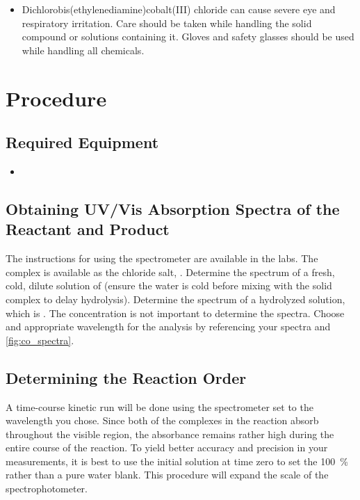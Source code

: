 \begin{itemize}
	\item Dichlorobis(ethylenediamine)cobalt(III) chloride can cause severe eye and respiratory irritation. Care should be taken while handling the solid compound or solutions containing it. Gloves and safety glasses should be used while handling all chemicals. 
\end{itemize}

\section{Procedure}
\label{sec:procedure}

\subsection{Required Equipment}
\label{subs:req_equip}

\begin{itemize}
	\item 
\end{itemize}

\subsection{Obtaining UV/Vis Absorption Spectra of the Reactant and Product}

The instructions for using the spectrometer are available in the labs. The  complex is available as the chloride salt, . Determine the spectrum of a fresh, cold, dilute solution of  (ensure the water is cold before mixing with the solid complex to delay hydrolysis). Determine the spectrum of a hydrolyzed solution, which is . The concentration is not important to determine the spectra. Choose and appropriate wavelength for the analysis by referencing your spectra and \cref{fig:co_spectra}. 

\subsection{Determining the Reaction Order} 

A time-course kinetic run will be done using the spectrometer set to the wavelength you chose. Since both of the complexes in the reaction absorb throughout the visible region, the absorbance remains rather high during the entire course of the reaction. To yield better accuracy and precision in your measurements, it is best to use the initial solution at time zero to set the \qty{100}{\percent} rather than a pure water blank. This procedure will expand the scale of the spectrophotometer. 


